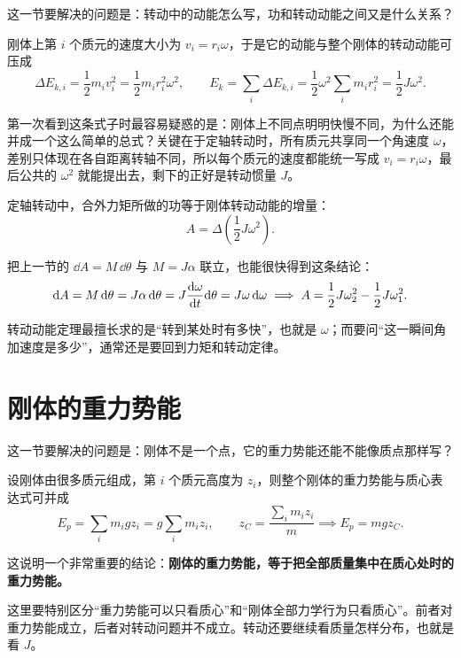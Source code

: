 \documentclass[lang=cn,11pt]{elegantbook}
\begin{document}
这一节要解决的问题是：转动中的动能怎么写，功和转动动能之间又是什么关系？

刚体上第 \(i\) 个质元的速度大小为 \(v_i=r_i\omega\)，于是它的动能与整个刚体的转动动能可压成
\[
\Delta E_{k,i}=\frac12 m_i v_i^2=\frac12 m_i r_i^2\omega^2,\qquad
E_k=\sum_i \Delta E_{k,i}
=\frac12 \omega^2\sum_i m_i r_i^2
=\frac12 J\omega^2.
\]

\begin{note}
第一次看到这条式子时最容易疑惑的是：刚体上不同点明明快慢不同，为什么还能并成一个这么简单的总式？关键在于定轴转动时，所有质元共享同一个角速度 \(\omega\)，差别只体现在各自距离转轴不同，所以每个质元的速度都能统一写成 \(v_i=r_i\omega\)，最后公共的 \(\omega^2\) 就能提出去，剩下的正好是转动惯量 \(J\)。
\end{note}

\begin{theorem}[转动动能定理]\label{thm:rotational-kinetic-theorem}
定轴转动中，合外力矩所做的功等于刚体转动动能的增量：
\[
A=\Delta\left(\frac12 J\omega^2\right).
\]
\end{theorem}

把上一节的 \(\dd A=M\,\dd\theta\) 与 \(M=J\alpha\) 联立，也能很快得到这条结论：
\[
\dd A=M\,\dd\theta=J\alpha\,\dd\theta=J\dv{\omega}{t}\dd\theta=J\omega\,\dd\omega
\implies A=\frac12 J\omega_2^2-\frac12 J\omega_1^2.
\]

\begin{note}
转动动能定理最擅长求的是“转到某处时有多快”，也就是 \(\omega\)；而要问“这一瞬间角加速度是多少”，通常还是要回到力矩和转动定律。
\end{note}

\section{刚体的重力势能}

这一节要解决的问题是：刚体不是一个点，它的重力势能还能不能像质点那样写？

设刚体由很多质元组成，第 \(i\) 个质元高度为 \(z_i\)，则整个刚体的重力势能与质心表达式可并成
\[
E_p=\sum_i m_i g z_i=g\sum_i m_i z_i,\qquad
z_C=\frac{\sum_i m_i z_i}{m}\implies E_p=mgz_C.
\]

这说明一个非常重要的结论：\textbf{刚体的重力势能，等于把全部质量集中在质心处时的重力势能。}

\begin{note}
这里要特别区分“重力势能可以只看质心”和“刚体全部力学行为只看质心”。前者对重力势能成立，后者对转动问题并不成立。转动还要继续看质量怎样分布，也就是看 \(J\)。
\end{note}
\end{document}
